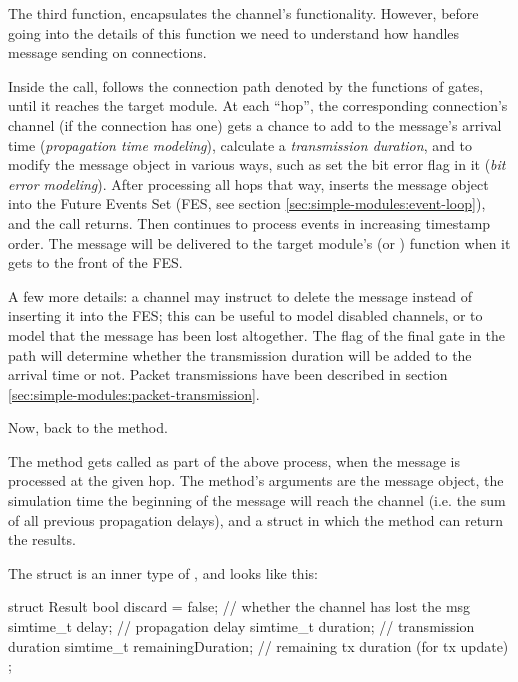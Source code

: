 The third function,  encapsulates the channel's
functionality. However, before going into the details of this function
we need to understand how {\opp} handles message sending on connections.

Inside the  call, {\opp} follows the
connection path denoted by the  functions of gates,
until it reaches the target module. At each ``hop'', the corresponding
connection's channel (if the connection has one) gets a chance to add to
the message's arrival time (\textit{propagation time modeling}), calculate a
\textit{transmission duration}, and to modify the message object in various
ways, such as set the bit error flag in it (\textit{bit error modeling}).
After processing all hops that way, {\opp} inserts the message object
into the Future Events Set (FES, see section
\ref{sec:simple-modules:event-loop}), and the  call returns.
Then {\opp} continues to process events in increasing timestamp order.
The message will be delivered to the target module's 
(or ) function when it gets to the front of the FES.

A few more details: a channel may instruct {\opp} to delete the message
instead of inserting it into the FES; this can be useful to model
disabled channels, or to model that the message has been lost altogether.
The  flag of the final gate in the path
will determine whether the transmission duration will be added to the
arrival time or not. Packet transmissions have been described in section
\ref{sec:simple-modules:packet-transmission}.

Now, back to the  method.

The method gets called as part of the above process, when the message
is processed at the given hop. The method's arguments are the message
object, the simulation time the beginning of the message will reach
the channel (i.e. the sum of all previous propagation delays),
and a struct in which the method can return the results.

The  struct is an inner type of ,
and looks like this:

\begin{cpp}
struct Result
{
    bool discard = false;        // whether the channel has lost the msg
    simtime_t delay;             // propagation delay
    simtime_t duration;          // transmission duration
    simtime_t remainingDuration; // remaining tx duration (for tx update)
};
\end{cpp}

